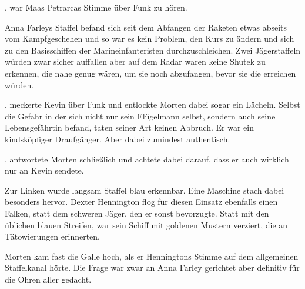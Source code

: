 , war Maas Petrarcas Stimme über Funk zu hören. 

\par

Anna Farleys Staffel befand sich seit dem Abfangen der Raketen etwas abseits vom Kampfgeschehen und so war es kein Problem, den Kurs zu ändern und sich zu den Basisschiffen der Marineinfanteristen durchzuschleichen. Zwei Jägerstaffeln würden zwar sicher auffallen aber auf dem Radar waren keine Shutek zu erkennen, die nahe genug wären, um sie noch abzufangen, bevor sie die  erreichen würden.

\par

, meckerte Kevin über Funk und entlockte Morten dabei sogar ein Lächeln. Selbst die Gefahr in der sich nicht nur sein Flügelmann selbst, sondern auch seine Lebensgefährtin befand, taten seiner Art keinen Abbruch. Er war ein kindsköpfiger Draufgänger. Aber dabei zumindest authentisch.

\par

, antwortete Morten schließlich und achtete dabei darauf, dass er auch wirklich nur an Kevin sendete. 

\par

Zur Linken wurde langsam Staffel blau erkennbar. Eine Maschine stach dabei besonders hervor. Dexter Hennington flog für diesen Einsatz ebenfalls einen Falken, statt dem schweren Jäger, den er sonst bevorzugte. Statt mit den üblichen blauen Streifen, war sein Schiff mit goldenen Mustern verziert, die an Tätowierungen erinnerten.

\par

 Morten kam fast die Galle hoch, als er Henningtons Stimme auf dem allgemeinen Staffelkanal hörte. Die Frage war zwar an Anna Farley gerichtet aber definitiv für die Ohren aller gedacht.

